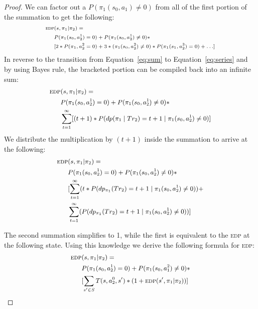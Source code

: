 \documentclass[letterpaper]{article}
\providecommand{\DIFaddbegin}{} %
\providecommand{\DIFaddend}{} %
\providecommand{\DIFdelbegin}{} %
\providecommand{\DIFdelend}{} %
\newcommand{\DIFscaledelfig}{0.5}
\newlength{\DIFdelgraphicswidth} %
\newlength{\DIFdelgraphicsheight} %
\newcommand{\DIFaddincludegraphics}[2][]{{\color{blue}\fbox{\DIFOincludegraphics[#1]{#2}}}} %
\newcommand{\DIFdelincludegraphics}[2][]{%
\sbox{\DIFdelgraphicsbox}{\DIFOincludegraphics[#1]{#2}}%
\settoboxwidth{\DIFdelgraphicswidth}{\DIFdelgraphicsbox} %
\settoboxtotalheight{\DIFdelgraphicsheight}{\DIFdelgraphicsbox} %
\scalebox{\DIFscaledelfig}{%
\parbox[b]{\DIFdelgraphicswidth}{\usebox{\DIFdelgraphicsbox}\\[-\baselineskip] \rule{\DIFdelgraphicswidth}{0em}}\llap{\resizebox{\DIFdelgraphicswidth}{\DIFdelgraphicsheight}{%
\setlength{\unitlength}{\DIFdelgraphicswidth}%
\begin{picture}(1,1)%
\thicklines\linethickness{2pt} %
{\color[rgb]{1,0,0}\put(0,0){\framebox(1,1){}}}%
{\color[rgb]{1,0,0}\put(0,0){\line( 1,1){1}}}%
{\color[rgb]{1,0,0}\put(0,1){\line(1,-1){1}}}%
\end{picture}%
}\hspace*{3pt}}} %
} %
\DeclareRobustCommand{\DIFaddbegin}{\DIFOaddbegin \let\includegraphics\DIFaddincludegraphics} %
\DeclareRobustCommand{\DIFaddend}{\DIFOaddend \let\includegraphics\DIFOincludegraphics} %
\DeclareRobustCommand{\DIFdelbegin}{\DIFOdelbegin \let\includegraphics\DIFdelincludegraphics} %
\DeclareRobustCommand{\DIFdelend}{\DIFOaddend \let\includegraphics\DIFOincludegraphics} %
\begin{document}
\begin{proof}
\noindent We can factor out a $P(\pi_1(s_0, a_1) \neq 0)$ from all of the first portion of the summation to get the following:
\begin{equation*}
\scriptsize
\begin{split}
    \textsc{edp} & (s, \pi_1 | \pi_2) = \\
    & P(\pi_1(s_0, a_2^1) = 0) + P(\pi_1(s_0, a_2^1) \neq 0) * \\
    & [2*P(\pi_1, a_2^2 = 0) + 3*(\pi_1(s_0, a_2^2) \neq 0)*P(\pi_1(s_1, a_2^3) = 0) + \ldots]
\end{split}
\normalsize
\end{equation*}
In reverse to the transition from Equation~\ref{eq:sum} to Equation~\ref{eq:series} and by using Bayes rule, the bracketed portion can be compiled back into an infinite sum: %
\begin{equation*}
\DIFdelbegin %
\DIFdelend \DIFaddbegin \small
\DIFaddend \begin{split}
    \textsc{edp} & (s, \pi_1 | \pi_2) = \\
    & P(\pi_1(s_0, a^1_2) = 0) + P(\pi_1(s_0, a^1_2) \neq 0) * \\ & \sum\limits_{t=1}^\infty[(t+1) * P(dp(\pi_1 \mid Tr_2) = t+1 \mid \pi_1(s_0, a^1_2) \neq 0)]
\end{split}
\normalsize
\end{equation*}
We distribute the multiplication by $(t+1)$ inside the summation to arrive at the following:
\begin{equation*}
\DIFdelbegin %
\DIFdelend \DIFaddbegin \small
\DIFaddend \begin{split}
    \textsc{edp} & (s, \pi_1 | \pi_2) = \\
    & P(\pi_1(s_0,a_2^1) = 0) + P(\pi_1(s_0, a_2^1) \neq 0) * \\ & [\sum\limits_{t=1}^\infty(t * P(dp_{\pi_1}(Tr_2) = t+1 \mid \pi_1(s_0, a_2^1) \neq 0)) + \\ & \sum\limits_{t=1}^\infty (P(dp_{\pi_1}(Tr_2) = t+1 \mid \pi_1(s_0, a_2^1) \neq 0))]
\end{split}
\normalsize
\end{equation*}

\noindent The second summation simplifies to 1, while the first is equivalent to the \textsc{edp} at the following state. Using this knowledge %
we derive the following formula for \textsc{edp}:
\begin{equation*}
\DIFdelbegin %
\DIFdelend \DIFaddbegin \small
\DIFaddend \begin{split}
    \textsc{edp} & (s, \pi_1 |  \pi_2) = \\
    & P(\pi_1(s_0, a_2^1) = 0) + P(\pi_1(s_0, a^2_1) \neq 0) * \\ &
    [\sum\limits_{s'\in S}T(s,a_2^0,s')*(1+\textsc{edp}(s', \pi_1 | \pi_2))]
\end{split}
\normalsize
\end{equation*}


\end{proof}
\end{document}
